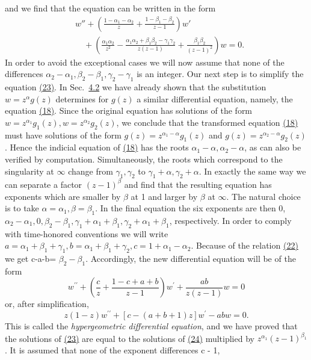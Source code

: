 and we find that the equation can be written in the form
\begin{equation*}
\begin{aligned}
&w''+\left(\frac{1-\alpha_1-\alpha_2}{z}+\frac{1-\beta_1-\beta_2}{z-1}\right)w'\\
&\quad+\left(\frac{\alpha_1\alpha_2}{z^2}
-\frac{\alpha_1\alpha_2+\beta_1\beta_2-\gamma_1\gamma_2}{z(z-1)}
+\frac{\beta_1\beta_2}{(z-1)^2}\right)w=0.
\end{aligned}\tag{23}\label{eq:8.23}
\end{equation*}
In order to avoid the exceptional cases we will now assume that none of the differences $\alpha_{2}-\alpha_{1},\beta_{2}-\beta_{1},\gamma_{2}-\gamma_{1}$ is an integer. Our next step is to simplify the equation \hyperref[eq:8.23]{(23)}. In Sec.~\hyperref[sec:8.4.2]{4.2} we have already shown that the substitution $w=z^{\alpha}g(z)$ determines for $g(z)$ a similar differential equation, namely, the equation \hyperref[eq:8.18]{(18)}. Since the original equation has solutions of the form $w=z^{\alpha_{1}}g_{1}(z),w=z^{\alpha_{2}}g_{2}(z)$, we conclude that the transformed equation \hyperref[eq:8.18]{(18)} must have solutions of the form $g(z)=z^{\alpha_{1}-\alpha}g_{1}(z)$ and $g(z)=z^{\alpha_{2}-\alpha}g_{2}(z)$. Hence the indicial equation of \hyperref[eq:8.18]{(18)} has the roots $\alpha_{1}-\alpha,\alpha_{2}-\alpha$, as can also be verified by computation. Simultaneously, the roots which correspond to the singularity at $\infty$ change from $\gamma_{1},\gamma_{2}$ to $\gamma_{1}+\alpha,\gamma_{2}+\alpha$. In exactly the same way we can separate a factor $(z-1)^{\beta}$ and find that the resulting equation has exponents which are smaller by $\beta$ at 1 and larger by $\beta$ at $\infty$. The natural choice is to take $\alpha=\alpha_{1},\beta=\beta_{1}$. In the final equation the six exponents are then 0, $\alpha_{2}-\alpha_{1},0,\beta_{2}-\beta_{1},\gamma_{1}+\alpha_{1}+\beta_{1},\gamma_{2}+\alpha_{1}+\beta_{1}$, respectively. In order to comply with time-honored conventions we will write $a=\alpha_{1}+\beta_{1}+\gamma_{1},b=\alpha_{1}+\beta_{1}+\gamma_{2},c=1+\alpha_{1}-\alpha_{2}$. Because of the relation \hyperref[eq:8.22]{(22)} we get c-a-b= $\beta_{2}-\beta_{1}$. Accordingly, the new differential equation will be of the form
\begin{equation*}
w ^ {\prime \prime} + \left(\frac {c}{z} + \frac {1 - c + a + b}{z - 1}\right) w ^ {\prime} + \frac {a b}{z (z - 1)} w = 0
\end{equation*}
or, after simplification,
\begin{equation*}
z (1 - z) w ^ {\prime \prime} + [ c - (a + b + 1) z ] w ^ {\prime} - a b w = 0.\tag{24}\label{eq:8.24}
\end{equation*}
This is called the \emph{hypergeometric differential equation}, and we have proved that the solutions of \hyperref[eq:8.23]{(23)} are equal to the solutions of \hyperref[eq:8.24]{(24)} multiplied by $z^{\alpha_{1}}(z - 1)^{\beta_{1}}$. It is assumed that none of the exponent differences c - 1,


